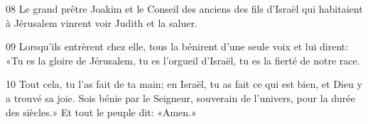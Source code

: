 
08 Le grand prêtre Joakim et le Conseil des anciens des fils d'Israël qui habitaient à Jérusalem vinrent voir Judith et la saluer.

09 Lorsqu'ils entrèrent chez elle, tous la bénirent d'une seule voix et lui dirent: «Tu es la gloire de Jérusalem, tu es l'orgueil d'Israël, tu es la fierté de notre race.

10 Tout cela, tu l'as fait de ta main; en Israël, tu as fait ce qui est bien, et Dieu y a trouvé sa joie. Sois bénie par le Seigneur, souverain de l'univers, pour la durée des siècles.» Et tout le peuple dit: «Amen.»
